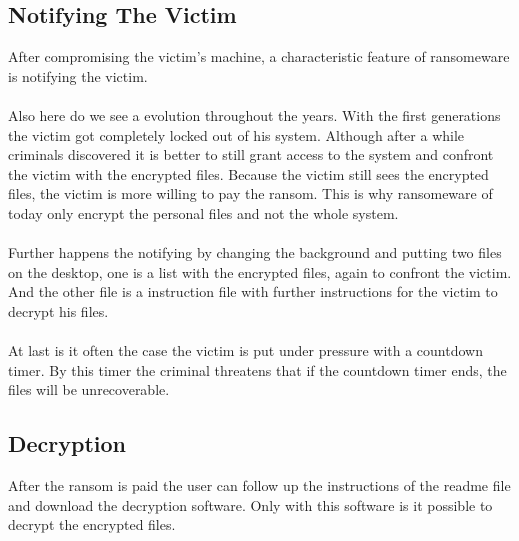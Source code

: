 \subsection{Notifying The Victim}\label{notify}

After compromising the victim's machine, a characteristic feature of ransomeware is notifying the victim.\\
\\
Also here do we see a evolution throughout the years. With the first generations the victim got completely locked out of his system. Although after a while criminals discovered it is better to still grant access to the system and confront the victim with the encrypted files. Because the victim still sees the encrypted files, the victim is more willing to pay the ransom. This is why ransomeware of today only encrypt the personal files and not the whole system. \\
\\

Further happens the notifying by changing the background and putting two files on the desktop, one is a list with the encrypted files, again to confront the victim. And the other file is a instruction file with further instructions for the victim to decrypt his files.\\
\\

At last is it often the case the victim is put under pressure with a countdown timer. By this timer the criminal threatens that if the countdown timer ends, the files will be unrecoverable.

\subsection{Decryption}\label{decryption}

After the ransom is paid the user can follow up the instructions of the readme file and download the decryption software. Only with this software is it possible to decrypt the encrypted files.
